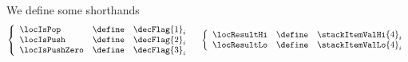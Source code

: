 We define some shorthands
\[
	\left\{ \begin{array}{lcl}
		\locIsPop      & \define & \decFlag  {1} _{i} \\
		\locIsPush     & \define & \decFlag  {2} _{i} \\
		\locIsPushZero & \define & \decFlag  {3} _{i} \\
	\end{array} \right.
	\quad
	\left\{ \begin{array}{lcl}
		\locResultHi & \define & \stackItemValHi  {4} _{i} \\
		\locResultLo & \define & \stackItemValLo  {4} _{i} \\
	\end{array} \right.
\]

